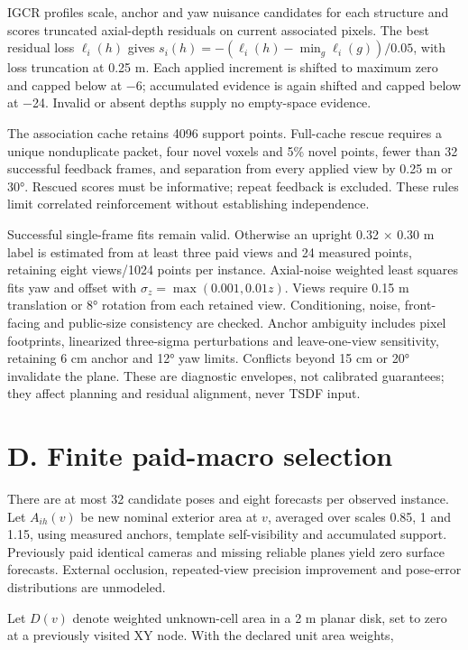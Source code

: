 \documentclass[11pt,a4paper]{article}
\begin{document}
IGCR profiles scale, anchor and yaw nuisance candidates for each structure and scores truncated axial-depth residuals on current associated pixels. The best residual loss \(\ell_i(h)\) gives \(s_i(h)=-(\ell_i(h)-\min_g\ell_i(g))/0.05\), with loss truncation at 0.25 m. Each applied increment is shifted to maximum zero and capped below at −6; accumulated evidence is again shifted and capped below at −24. Invalid or absent depths supply no empty-space evidence.

The association cache retains 4096 support points. Full-cache rescue requires a unique nonduplicate packet, four novel voxels and 5\% novel points, fewer than 32 successful feedback frames, and separation from every applied view by 0.25 m or 30°. Rescued scores must be informative; repeat feedback is excluded. These rules limit correlated reinforcement without establishing independence.

Successful single-frame fits remain valid. Otherwise an upright 0.32 × 0.30 m label is estimated from at least three paid views and 24 measured points, retaining eight views/1024 points per instance. Axial-noise weighted least squares fits yaw and offset with \(\sigma_z=\max(0.001,0.01z)\). Views require 0.15 m translation or 8° rotation from each retained view. Conditioning, noise, front-facing and public-size consistency are checked. Anchor ambiguity includes pixel footprints, linearized three-sigma perturbations and leave-one-view sensitivity, retaining 6 cm anchor and 12° yaw limits. Conflicts beyond 15 cm or 20° invalidate the plane. These are diagnostic envelopes, not calibrated guarantees; they affect planning and residual alignment, never TSDF input.

\hypertarget{d.-finite-paid-macro-selection}{%
\section*{D. Finite paid-macro selection}\label{d.-finite-paid-macro-selection}}

There are at most 32 candidate poses and eight forecasts per observed instance. Let \(A_{ih}(v)\) be new nominal exterior area at \(v\), averaged over scales 0.85, 1 and 1.15, using measured anchors, template self-visibility and accumulated support. Previously paid identical cameras and missing reliable planes yield zero surface forecasts. External occlusion, repeated-view precision improvement and pose-error distributions are unmodeled.

Let \(D(v)\) denote weighted unknown-cell area in a 2 m planar disk, set to zero at a previously visited XY node. With the declared unit area weights,
\end{document}
